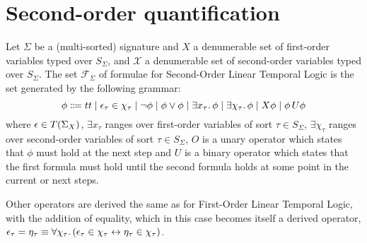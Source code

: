 \section{Second-order quantification}

\begin{definition}
Let $\Sigma$ be a (multi-sorted) signature and $X$ a denumerable set of first-order variables typed over $S_\Sigma$, and
$\mathcal{X}$ a denumerable set of second-order variables typed over $S_\Sigma$. The set $\mathcal{F}_\Sigma$ of
formulae for Second-Order Linear Temporal Logic is the set generated by the following grammar:
\[
  \phi \Coloneqq tt \;|\; \epsilon_\tau \in \chi_\tau
                    \;|\; \neg\phi
                    \;|\; \phi \lor \phi
                    \;|\; \exists {x_\tau} \ldotp {\phi}
                    \;|\; \exists {\chi_\tau} \ldotp {\phi}
                    \;|\; X{\phi}
                    \;|\; {\phi}\,U {\phi}
\]
where $\epsilon \in T({\Sigma}_{X})$, $\exists x_\tau$ ranges over first-order variables of sort $\tau \in S_\Sigma$,
$\exists \chi_\tau$ ranges over second-order variables of sort $\tau \in S_\Sigma$,
$O$ is a unary operator which states that $\phi$ must hold at the next step and $U$ is a binary operator which states
that the first formula must hold until the second formula holds at some point in the current or next steps.
\end{definition}

Other operators are derived the same as for First-Order Linear Temporal Logic, with the addition of equality, which in
this case becomes itself a derived operator, $\epsilon_\tau = \eta_\tau \equiv \forall {\chi_\tau} \ldotp {(}\epsilon_\tau \in
\chi_\tau \leftrightarrow \eta_\tau \in \chi_\tau)$.

